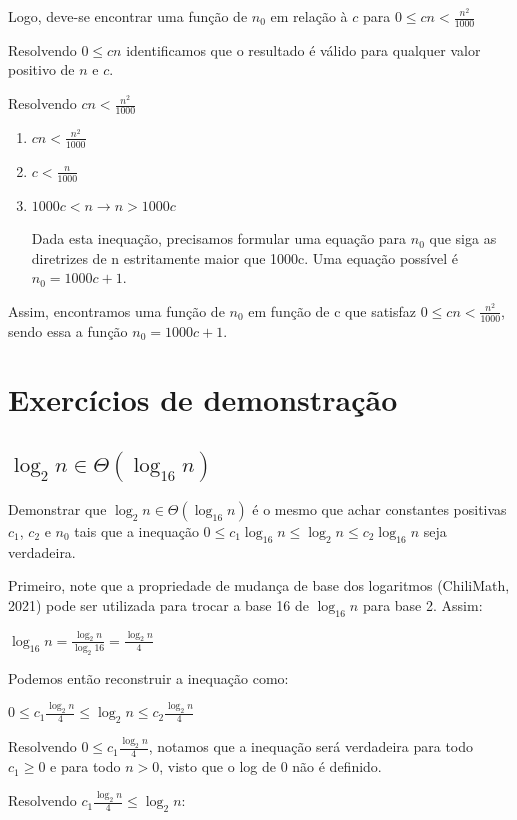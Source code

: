 \documentclass[ a4paper, twocolumn]{article}
\theoremstyle{definition}
\begin{document}
Logo, deve-se encontrar uma função de $n_0$ em relação à $c$ para $0 \leq cn < \frac{n^2}{1000}$

Resolvendo $0 \leq cn$ identificamos que o resultado é válido para qualquer valor positivo de $n$ e $c$.

Resolvendo $cn < \frac{n^2}{1000}$

\begin{enumerate}[Step 1:]
	\item $cn < \frac{n^2}{1000}$
	\item $c < \frac{n}{1000}$
	\item $1000c < n \rightarrow n > 1000c$
	
	Dada esta inequação, precisamos formular uma equação para $n_0$ que siga as diretrizes de n estritamente maior que 1000c. Uma equação possível é $n_0 = 1000c + 1$.
\end{enumerate}
Assim, encontramos uma função de $n_0$ em função de c que satisfaz  $0 \leq cn < \frac{n^2}{1000}$, sendo essa a função $n_0 = 1000c + 1$.

\section{Exercícios de demonstração}
\subsection{$\log_2n \in \Theta(\log_{16}n)$}
Demonstrar que $\log_2n \in \Theta(\log_{16}n)$ é o mesmo que achar constantes positivas $c_1$, $c_2$ e $n_0$ tais que a inequação $0 \leq c_1 \log_{16}n \leq \log_2n \leq c_2 \log_{16}n$ seja verdadeira.

Primeiro, note que a propriedade de mudança de base dos logaritmos (ChiliMath, 2021) pode ser utilizada para trocar a base 16 de $\log_{16}n$ para base 2. Assim:

$\log_{16}n = \frac{\log_{2}n}{\log_{2}16} = \frac{\log_{2}n}{4}$

Podemos então reconstruir a inequação como:

$0 \leq c_1 \frac{\log_{2}n}{4} \leq \log_2n \leq c_2\frac{\log_{2}n}{4}$

Resolvendo $0 \leq c_1 \frac{\log_{2}n}{4}$, notamos que a inequação será verdadeira para todo $c_1 \geq 0$ e para todo $n > 0$, visto que o log de 0 não é definido.

Resolvendo $c_1 \frac{\log_{2}n}{4} \leq \log_2n$:
\end{document}
